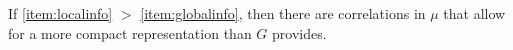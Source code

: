 \documentclass[letterpaper]{article} %
\theoremstyle{plain}
\theoremstyle{definition}
\theoremstyle{remark}
\begin{document}
%
If \ref{item:localinfo} $>$ \ref{item:globalinfo}, then there are
correlations in $\mu$ that allow for a more compact representation
than $G$ provides. 
%
\end{document}
